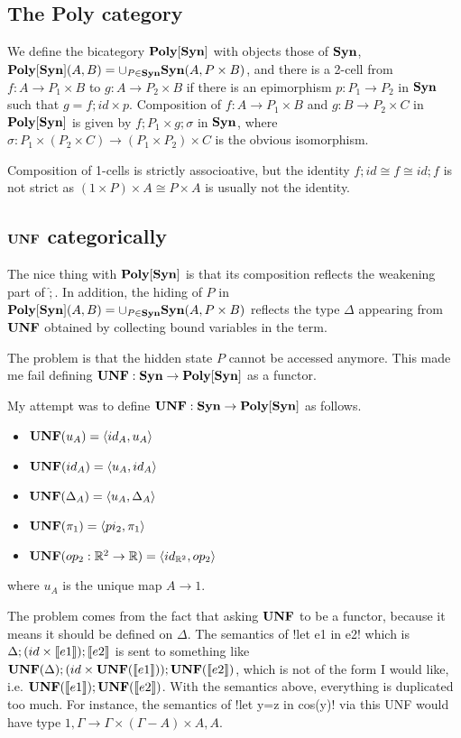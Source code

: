\subsection{The Poly category} 

We define the bicategory $\mathbf{Poly[Syn]}$ with objects those of $\mathbf{Syn}$, $\mathbf{Poly[Syn]}(A,B)=\cup_{P\in\mathbf{Syn}}\mathbf{Syn}(A,P\times B)$, and there is a 2-cell from $f:A\to P_1\times B$ to $g:A\to P_2\times B$ if there is an epimorphism $p:P_1\to P_2$ in $\mathbf{Syn}$ such that $g=f;id\times p$.
Composition of $f:A\to P_1\times B$ and $g:B\to P_2\times C$ in $\mathbf{Poly[Syn]}$ is given by $f;P_1\times g;\sigma$ in $\mathbf{Syn}$, where $\sigma:P_1\times(P_2\times C)\to (P_1\times P_2)\times C$ is the obvious isomorphism.

Composition of 1-cells is strictly associoative, but the identity $f;id\cong f\cong id;f$ is not strict as $(1\times P)\times A\cong P\times A$ is usually not the identity.


\subsection{$\mathbf{UNF}$ categorically} 

The nice thing with $\mathbf{Poly[Syn]}$ is that its composition reflects the weakening part of $\widehat{;}$. In addition, the hiding of $P$ in $\mathbf{Poly[Syn]}(A,B)=\cup_{P\in\mathbf{Syn}}\mathbf{Syn}(A,P\times B)$ reflects the type $\Delta$ appearing from $\mathbf{UNF}$ obtained by collecting bound variables in the term. 

The problem is that the hidden state $P$ cannot be accessed anymore. This made me fail defining $\mathbf{UNF}:\mathbf{Syn}\to\mathbf{Poly[Syn]}$ as a functor.


My attempt was to define $\mathbf{UNF}:\mathbf{Syn}\to\mathbf{Poly[Syn]}$ as follows. 
\begin{itemize}
	\item $\mathbf{UNF}(u_A) =\langle id_A,u_A\rangle$
	\item $\mathbf{UNF}(id_A) = \langle u_A,id_A \rangle$
	\item $\mathbf{UNF}(\Delta_A) = \langle u_A,\Delta_A \rangle$
	\item $\mathbf{UNF}(\pi_1) = \langle pi_2, \pi_1 \rangle$
	\item $\mathbf{UNF}(op_2:\mathbb{R}^2\to\mathbb{R}) = \langle id_{\mathbb{R}^2},op_2\rangle$ 
\end{itemize}
where $u_A$ is the unique map $A\to 1$.

The problem comes from the fact that asking $\mathbf{UNF}$ to be a functor, because it means it should be defined on $\Delta$. The semantics of !let e1 in e2! which is $\Delta;(id\times\llbracket e1\rrbracket);\llbracket e2\rrbracket$ is sent to something like $\mathbf{UNF}(\Delta);(id\times \mathbf{UNF}(\llbracket e1\rrbracket));\mathbf{UNF}(\llbracket e2\rrbracket)$, which is not of the form I would like, i.e. $\mathbf{UNF}(\llbracket e1\rrbracket);\mathbf{UNF}(\llbracket e2\rrbracket)$. 
With the semantics above, everything is duplicated too much. For instance, the semantics of  !let y=z in cos(y)!  via this UNF would have type $1,\Gamma\to \Gamma\times (\Gamma-A)\times A, A$.


